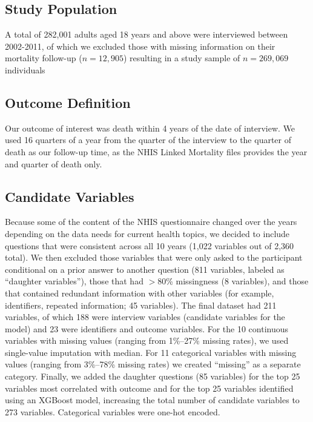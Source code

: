 \documentclass[reqno,11pt]{article}
\begin{document}
\subsection {Study Population}\label{sec:spop}
A total of 282,001 adults aged 18 years and above were interviewed between 2002-2011, of which we excluded those with missing information on their mortality follow-up ($n=12,905$) resulting in a study sample of $n=269,069$ individuals

\subsection {Outcome Definition}\label{sec:outcome}
Our outcome of interest was death within 4 years of the date of interview. We used 16 quarters of a year from the quarter of the interview to the quarter of death as our follow-up time, as the NHIS Linked Mortality files provides the year and quarter of death only. 

\subsection {Candidate Variables}\label{sec:candid}
Because some of the content of the NHIS questionnaire changed over the years depending on the data needs for current health topics, we decided to include questions that were consistent across all 10 years (1,022 variables out of 2,360 total). We then excluded those variables that were only asked to the participant conditional on a prior answer to another question (811 variables, labeled as “daughter variables”), those that had $>80$\% missingness (8 variables), and those that contained redundant information with other variables (for example, identifiers, repeated information; 45 variables). The final dataset had 211 variables, of which 188 were interview variables (candidate variables for the model) and 23 were identifiers and outcome variables. For the 10 continuous variables with missing values (ranging from 1\%–27\% missing rates), we used single-value imputation with median. For 11 categorical variables with missing values (ranging from 3\%–78\% missing rates) we created “missing” as a separate category. Finally, we added the daughter questions (85 variables) for the top 25 variables most correlated with outcome and for the top 25 variables identified using an XGBoost model, increasing the total number of candidate variables to 273 variables. Categorical variables were one-hot encoded.

\end{document}
